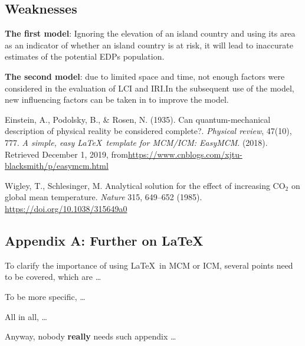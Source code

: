 \documentclass[12pt]{article}  %
\begin{document}
\subsection{Weaknesses}

\textbf{The first model}: Ignoring the elevation of an island country and using its area as an indicator of whether an island country is at risk, it will lead to inaccurate estimates of the potential EDPs population.




\textbf{The second model}: due to limited space and time, not enough factors were considered in the evaluation of LCI and IRI.In the subsequent use of the model, new influencing factors can be taken in to improve the model.





\begin{thebibliography}{99}
 Einstein, A., Podolsky, B., \& Rosen, N. (1935). Can quantum-mechanical description of physical reality be considered complete?. \emph{Physical review}, 47(10), 777.
 \emph{A simple, easy \LaTeX\ template for MCM/ICM: EasyMCM}. (2018). Retrieved December 1, 2019, from\url{https://www.cnblogs.com/xjtu-blacksmith/p/easymcm.html}


 Wigley, T., Schlesinger, M. Analytical solution for the effect of increasing CO$_2$ on global mean temperature. \emph{Nature} 315, 649–652 (1985). \url{https://doi.org/10.1038/315649a0}





\end{thebibliography}





\begin{subappendices}  %

\section{Appendix A: Further on \LaTeX}
To clarify the importance of using \LaTeX\ in MCM or ICM, several points need to be covered, which are \ldots

To be more specific, \ldots

All in all, \ldots

Anyway, nobody \textbf{really} needs such appendix \ldots

\end{subappendices}
\end{document}
